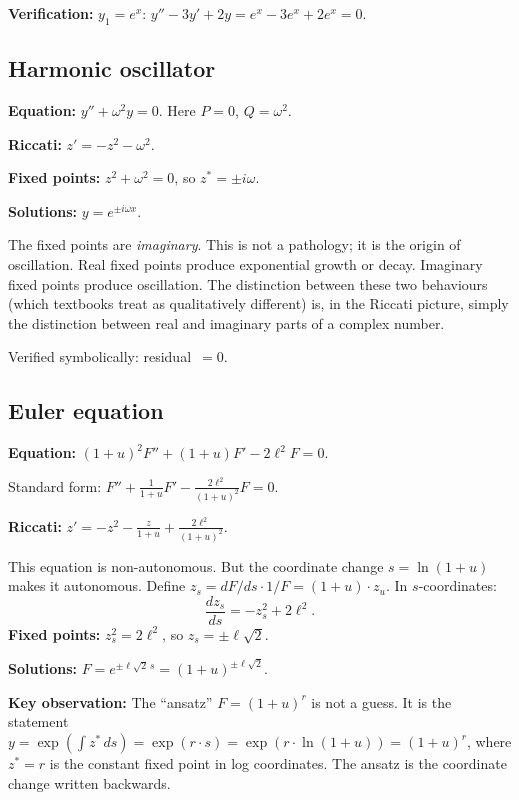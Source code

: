 \documentclass{amsart}
\theoremstyle{definition}
\theoremstyle{remark}
\begin{document}
\textbf{Verification:} $y_1 = e^x$: $y'' - 3y' + 2y = e^x - 3e^x + 2e^x = 0$. \checkmark

\subsection{Harmonic oscillator}

\textbf{Equation:} $y'' + \omega^2 y = 0$. Here $P = 0$, $Q = \omega^2$.

\textbf{Riccati:} $z' = -z^2 - \omega^2$.

\textbf{Fixed points:} $z^2 + \omega^2 = 0$, so $z^* = \pm i\omega$.

\textbf{Solutions:} $y = e^{\pm i\omega x}$.

The fixed points are \emph{imaginary}. This is not a pathology; it is the origin of oscillation. Real fixed points produce exponential growth or decay. Imaginary fixed points produce oscillation. The distinction between these two behaviours (which textbooks treat as qualitatively different) is, in the Riccati picture, simply the distinction between real and imaginary parts of a complex number.

Verified symbolically: residual~$= 0$. \checkmark

\subsection{Euler equation}

\textbf{Equation:} $(1+u)^2 F'' + (1+u)F' - 2\ell^2 F = 0$.

Standard form: $F'' + \frac{1}{1+u}F' - \frac{2\ell^2}{(1+u)^2}F = 0$.

\textbf{Riccati:} $z' = -z^2 - \frac{z}{1+u} + \frac{2\ell^2}{(1+u)^2}$.

This equation is non-autonomous. But the coordinate change $s = \ln(1+u)$ makes it autonomous. Define $z_s = dF/ds \cdot 1/F = (1+u)\cdot z_u$. In $s$-coordinates:
\[
\frac{dz_s}{ds} = -z_s^2 + 2\ell^2.
\]
\textbf{Fixed points:} $z_s^2 = 2\ell^2$, so $z_s = \pm\ell\sqrt{2}$.

\textbf{Solutions:} $F = e^{\pm\ell\sqrt{2}\,s} = (1+u)^{\pm\ell\sqrt{2}}$.

\textbf{Key observation:} The ``ansatz'' $F = (1+u)^r$ is not a guess. It is the statement $y = \exp(\int z^*\,ds) = \exp(r\cdot s) = \exp(r\cdot\ln(1+u)) = (1+u)^r$, where $z^* = r$ is the constant fixed point in log coordinates. The ansatz is the coordinate change written backwards.
\end{document}
